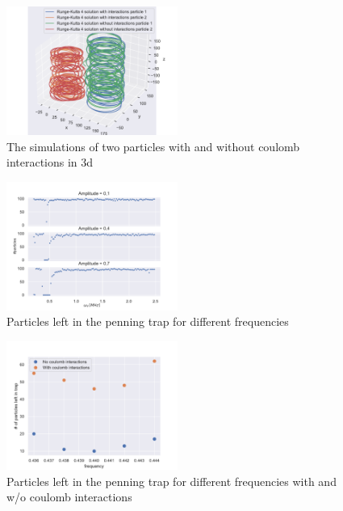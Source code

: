 \begin{figure}[h]
    \centering
    \includegraphics[width=0.5\textwidth]{data/two_particles_3d.pdf}
    \caption{The simulations of two particles with and without coulomb interactions in 3d}
    \label{fig:two_particles_xy_plane_3d}
\end{figure}

\begin{figure}[h]
    \centering
    \includegraphics[width=0.5\textwidth]{data/particles_left_rough_grained.pdf}
    \caption{Particles left in the penning trap for different frequencies}
    \label{fig:particles_left_rough_grained}
\end{figure}
\begin{figure}[h]
    \centering
    \includegraphics[width=0.5\textwidth]{data/particles_left_fine_grained.pdf}
    \caption{Particles left in the penning trap for different frequencies with and w/o coulomb interactions}
    \label{fig:particles_left_fine_grained}
\end{figure}

